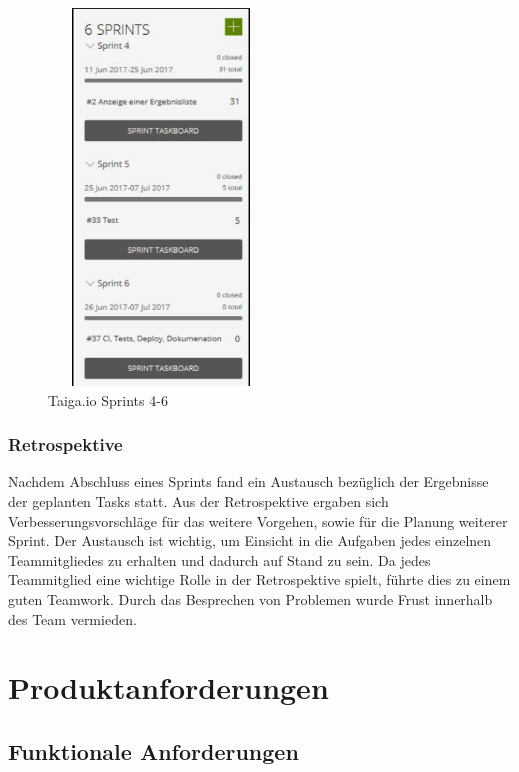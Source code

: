 \documentclass[a4paper, 11pt]{scrreprt}
\begin{document}
\begin{figure} [H]
\begin{center}

\includegraphics[width=6cm, height=10cm]{sprint_1.jpg}
\caption{Taiga.io Sprints 4-6}

\end{center}
\end{figure}

\subsection{Retrospektive}

Nachdem Abschluss eines Sprints fand ein Austausch
bezüglich der Ergebnisse der geplanten Tasks statt.
Aus der Retrospektive ergaben sich
Verbesserungsvorschläge für das weitere Vorgehen,
sowie für die Planung weiterer Sprint.
Der Austausch ist wichtig, um Einsicht in die
Aufgaben jedes einzelnen Teammitgliedes zu erhalten
und dadurch auf Stand zu sein. Da jedes Teammitglied eine wichtige Rolle in der Retrospektive spielt, führte dies zu einem guten Teamwork. Durch das Besprechen von Problemen wurde Frust innerhalb des Team vermieden.

\chapter{Produktanforderungen}

\section{Funktionale Anforderungen}
\end{document}
